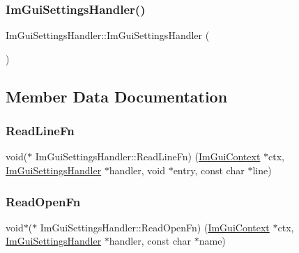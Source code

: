 \subsubsection{\texorpdfstring{Im\+Gui\+Settings\+Handler()}{ImGuiSettingsHandler()}}
{\footnotesize\ttfamily Im\+Gui\+Settings\+Handler\+::\+Im\+Gui\+Settings\+Handler (\begin{DoxyParamCaption}{ }\end{DoxyParamCaption})\hspace{0.3cm}{\ttfamily [inline]}}



\subsection{Member Data Documentation}
\mbox{\label{struct_im_gui_settings_handler_a0a02bad8569c2d9f22e1a532d1e2de60}} 
\subsubsection{\texorpdfstring{Read\+Line\+Fn}{ReadLineFn}}
{\footnotesize\ttfamily void($\ast$ Im\+Gui\+Settings\+Handler\+::\+Read\+Line\+Fn) (\mbox{\hyperlink{struct_im_gui_context}{Im\+Gui\+Context}} $\ast$ctx, \mbox{\hyperlink{struct_im_gui_settings_handler}{Im\+Gui\+Settings\+Handler}} $\ast$handler, void $\ast$entry, const char $\ast$line)}

\mbox{\label{struct_im_gui_settings_handler_accadc3cc1599382b55b58dac53df0b24}} 
\subsubsection{\texorpdfstring{Read\+Open\+Fn}{ReadOpenFn}}
{\footnotesize\ttfamily void$\ast$($\ast$ Im\+Gui\+Settings\+Handler\+::\+Read\+Open\+Fn) (\mbox{\hyperlink{struct_im_gui_context}{Im\+Gui\+Context}} $\ast$ctx, \mbox{\hyperlink{struct_im_gui_settings_handler}{Im\+Gui\+Settings\+Handler}} $\ast$handler, const char $\ast$name)}

